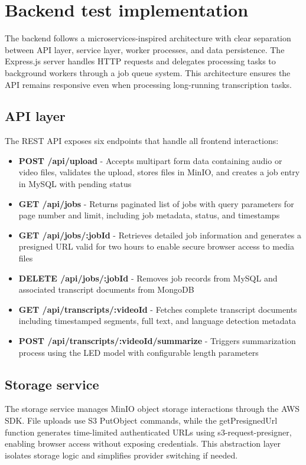 \section{Backend test implementation}
The backend follows a microservices-inspired architecture with clear separation between API layer, service layer, worker processes, and data persistence. The Express.js server handles HTTP requests and delegates processing tasks to background workers through a job queue system. This architecture ensures the API remains responsive even when processing long-running transcription tasks.
\subsection{API layer}
The REST API exposes six endpoints that handle all frontend interactions:
\begin{itemize}
    \item \textbf{POST /api/upload} - Accepts multipart form data containing audio or video files, validates the upload, stores files in MinIO, and creates a job entry in MySQL with pending status
    \item \textbf{GET /api/jobs} - Returns paginated list of jobs with query parameters for page number and limit, including job metadata, status, and timestamps
    \item \textbf{GET /api/jobs/:jobId} - Retrieves detailed job information and generates a presigned URL valid for two hours to enable secure browser access to media files
    \item \textbf{DELETE /api/jobs/:jobId} - Removes job records from MySQL and associated transcript documents from MongoDB
    \item \textbf{GET /api/transcripts/:videoId} - Fetches complete transcript documents including timestamped segments, full text, and language detection metadata
    \item \textbf{POST /api/transcripts/:videoId/summarize} - Triggers summarization process using the LED model with configurable length parameters
\end{itemize}

\subsection{Storage service}
The storage service manages MinIO object storage interactions through the AWS SDK. File uploads use S3 PutObject commands, while the getPresignedUrl function generates time-limited authenticated URLs using s3-request-presigner, enabling browser access without exposing credentials. This abstraction layer isolates storage logic and simplifies provider switching if needed.

